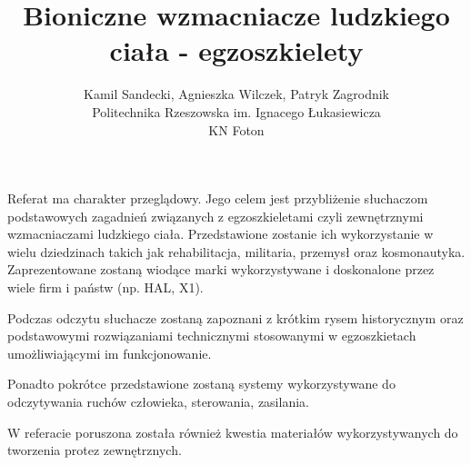 \documentclass[12pt, a4paper]{article}
\begin{document}
\title{Bioniczne wzmacniacze ludzkiego ciała - egzoszkielety}
\author{Kamil Sandecki, Agnieszka Wilczek, Patryk Zagrodnik \\ Politechnika Rzeszowska im. Ignacego Łukasiewicza \\KN Foton}
\date {}

\maketitle

\thispagestyle{title}

Referat ma charakter przeglądowy. Jego celem jest przybliżenie słuchaczom podstawowych zagadnień związanych z egzoszkieletami czyli zewnętrznymi wzmacniaczami ludzkiego ciała. Przedstawione zostanie ich wykorzystanie w wielu dziedzinach takich jak rehabilitacja, militaria, przemysł oraz kosmonautyka. Zaprezentowane zostaną wiodące marki wykorzystywane i doskonalone przez wiele firm i państw (np. HAL, X1). 

Podczas odczytu słuchacze zostaną zapoznani z krótkim rysem historycznym oraz podstawowymi rozwiązaniami technicznymi stosowanymi w egzoszkietach umożliwiającymi im funkcjonowanie.

Ponadto pokrótce przedstawione zostaną systemy wykorzystywane do odczytywania ruchów człowieka, sterowania, zasilania. 

W referacie poruszona została również kwestia materiałów wykorzystywanych do tworzenia protez zewnętrznych.
\end{document}
